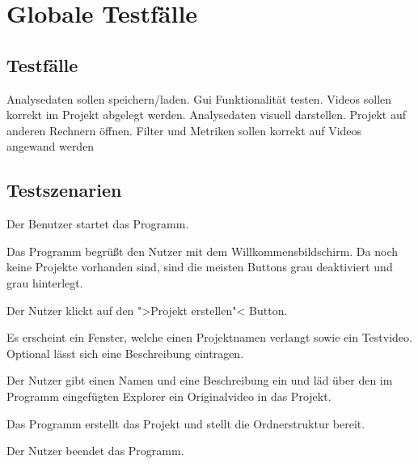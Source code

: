 \chapter{Globale Testfälle}
\section{Testfälle}
\setcounter{counterKriterien}{0}
 Analysedaten sollen speichern/laden.
 Gui Funktionalität testen.
 Videos sollen korrekt im Projekt abgelegt werden.
 Analysedaten visuell darstellen.
 Projekt auf anderen Rechnern öffnen.
 Filter und Metriken sollen korrekt auf Videos angewand werden

\section{Testszenarien}
\setcounter{counterKriterien}{0}
   \begin{compactenum}[1]
\item Der Benutzer startet das Programm.
\item Das Programm begrüßt den Nutzer mit dem Willkommensbildschirm. Da noch keine Projekte vorhanden sind, sind die meisten Buttons grau deaktiviert und grau hinterlegt.
\item Der Nutzer klickt auf den ">Projekt erstellen"< Button.
\item Es erscheint ein Fenster, welche einen Projektnamen verlangt sowie ein Testvideo. Optional lässt sich eine Beschreibung eintragen.
\item Der Nutzer gibt einen Namen und eine Beschreibung ein und läd über den im Programm eingefügten Explorer ein Originalvideo in das Projekt.
\item Das Programm erstellt das Projekt und stellt die Ordnerstruktur bereit.
\item Der Nutzer beendet das Programm.

\end{compactenum}

